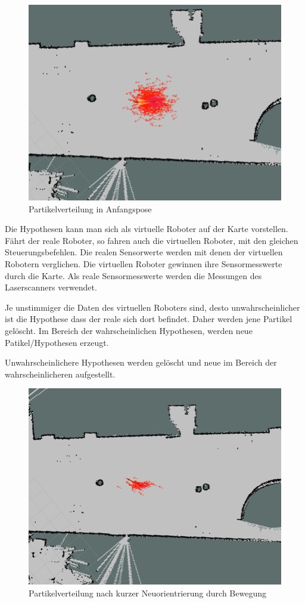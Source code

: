 \documentclass[11pt,a4paper]{article}
\begin{document}
{\begin{figure}[h]
	\includegraphics[width=\linewidth]{pictures/initial_distribution.jpg}
	\caption{Partikelverteilung in Anfangspose}
\end{figure}

Die Hypothesen kann man sich als virtuelle Roboter auf der Karte vorstellen. F\"ahrt der reale Roboter, so fahren auch die virtuellen Roboter, mit den gleichen Steuerungsbefehlen. Die realen Sensorwerte werden mit denen der virtuellen Robotern verglichen. Die virtuellen Roboter gewinnen ihre Sensormesswerte durch die Karte. Als reale Sensormesswerte werden die Messungen des Laserscanners verwendet.

Je unstimmiger die Daten des virtuellen Roboters sind, desto unwahrscheinlicher ist die Hypothese dass der reale sich dort befindet. Daher werden jene Partikel gelöscht. Im Bereich der wahrscheinlichen Hypothesen, werden neue Patikel/Hypothesen erzeugt.

Unwahrscheinlichere Hypothesen werden gel\"oscht und neue im Bereich der wahrscheinlicheren aufgestellt. 

\begin{figure}[h]
	\includegraphics[width=\linewidth]{pictures/drive_little.jpg}
	\caption{Partikelverteilung nach kurzer Neuorientrierung durch Bewegung}
\end{figure}
 
}
\end{document}
